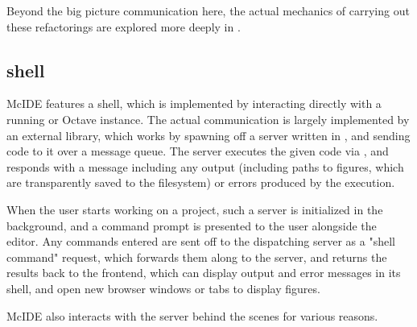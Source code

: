 Beyond the big picture communication here, the actual mechanics of carrying out
these refactorings are explored more deeply in
.

\subsection{\matlab shell}

McIDE features a \matlab shell, which is implemented by interacting directly
with a running \matlab or Octave instance. The actual communication is largely
implemented by an external library, which works by spawning off a server
written in \matlab, and sending code to it over a message queue. The server
executes the given code via , and responds with a message including
any output (including paths to figures, which are transparently saved to the
filesystem) or errors produced by the execution.

When the user starts working on a project, such a \matlab server is initialized
in the background, and a command prompt is presented to the user alongside the
editor. Any commands entered are sent off to the dispatching server as a "shell
command" request, which forwards them along to the \matlab server, and returns
the results back to the frontend, which can display output and error messages
in its shell, and open new browser windows or tabs to display figures.

McIDE also interacts with the \matlab server behind the scenes for various
reasons.

